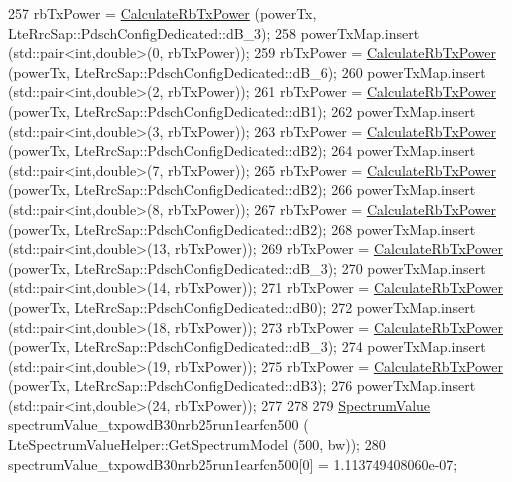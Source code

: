 \begin{DoxyCode}
257     rbTxPower = \hyperlink{classLteDownlinkPowerControlTestSuite_acbda226a1db61d5328141d80aca96447}{CalculateRbTxPower} (powerTx, LteRrcSap::PdschConfigDedicated::dB\_3);
258     powerTxMap.insert (std::pair<int,double>(0, rbTxPower));
259     rbTxPower = \hyperlink{classLteDownlinkPowerControlTestSuite_acbda226a1db61d5328141d80aca96447}{CalculateRbTxPower} (powerTx, LteRrcSap::PdschConfigDedicated::dB\_6);
260     powerTxMap.insert (std::pair<int,double>(2, rbTxPower));
261     rbTxPower = \hyperlink{classLteDownlinkPowerControlTestSuite_acbda226a1db61d5328141d80aca96447}{CalculateRbTxPower} (powerTx, LteRrcSap::PdschConfigDedicated::dB1);
262     powerTxMap.insert (std::pair<int,double>(3, rbTxPower));
263     rbTxPower = \hyperlink{classLteDownlinkPowerControlTestSuite_acbda226a1db61d5328141d80aca96447}{CalculateRbTxPower} (powerTx, LteRrcSap::PdschConfigDedicated::dB2);
264     powerTxMap.insert (std::pair<int,double>(7, rbTxPower));
265     rbTxPower = \hyperlink{classLteDownlinkPowerControlTestSuite_acbda226a1db61d5328141d80aca96447}{CalculateRbTxPower} (powerTx, LteRrcSap::PdschConfigDedicated::dB2);
266     powerTxMap.insert (std::pair<int,double>(8, rbTxPower));
267     rbTxPower = \hyperlink{classLteDownlinkPowerControlTestSuite_acbda226a1db61d5328141d80aca96447}{CalculateRbTxPower} (powerTx, LteRrcSap::PdschConfigDedicated::dB2);
268     powerTxMap.insert (std::pair<int,double>(13, rbTxPower));
269     rbTxPower = \hyperlink{classLteDownlinkPowerControlTestSuite_acbda226a1db61d5328141d80aca96447}{CalculateRbTxPower} (powerTx, LteRrcSap::PdschConfigDedicated::dB\_3);
270     powerTxMap.insert (std::pair<int,double>(14, rbTxPower));
271     rbTxPower = \hyperlink{classLteDownlinkPowerControlTestSuite_acbda226a1db61d5328141d80aca96447}{CalculateRbTxPower} (powerTx, LteRrcSap::PdschConfigDedicated::dB0);
272     powerTxMap.insert (std::pair<int,double>(18, rbTxPower));
273     rbTxPower = \hyperlink{classLteDownlinkPowerControlTestSuite_acbda226a1db61d5328141d80aca96447}{CalculateRbTxPower} (powerTx, LteRrcSap::PdschConfigDedicated::dB\_3);
274     powerTxMap.insert (std::pair<int,double>(19, rbTxPower));
275     rbTxPower = \hyperlink{classLteDownlinkPowerControlTestSuite_acbda226a1db61d5328141d80aca96447}{CalculateRbTxPower} (powerTx, LteRrcSap::PdschConfigDedicated::dB3);
276     powerTxMap.insert (std::pair<int,double>(24, rbTxPower));
277 
278 
279     \hyperlink{classns3_1_1SpectrumValue}{SpectrumValue} spectrumValue\_txpowdB30nrb25run1earfcn500 (
      LteSpectrumValueHelper::GetSpectrumModel (500, bw));
280     spectrumValue\_txpowdB30nrb25run1earfcn500[0] = 1.113749408060e-07;

\end{DoxyCode}
